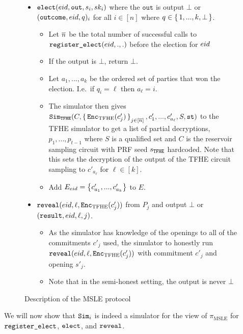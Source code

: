 \begin{figure}
{\begin{minipage}{1\textwidth}
\begin{itemize}

				\item $\texttt{elect}({eid}, \texttt{out}, s_i, sk_i)$ where the $\texttt{out}$ is output $\bot$ or $(\texttt{outcome}, {eid}, q)_i$ for all $i \in [n]$ where $q \in \set{1, ..., k, \bot}$.
				      \begin{itemize}
								\item Let $\overline{n}$ be the total number of successful calls to $\texttt{register\_elect}({eid}, ., .)$ before the election for ${eid}$
					      \item If the output is $\bot$, return $\bot$.
					      \item Let $a_1, ..., a_k$ be the ordered set of parties that won the election. I.e.\ if $q_i = \ell$ then $a_\ell = i$.
								\item The simulator then gives $\texttt{Sim}_{{\texttt{TFHE}}}(C, \set{\texttt{Enc}_{\mathrm{TFHE}}(c'_j)}_{j \in [\overline{n}]}, c'_1, ..., c'_{a_\ell}, S, \texttt{st})$
	to the TFHE simulator to get a list of partial decryptions, $p_1, ..., p_{t - 1}$ where $S$ is a qualified set %
	and $C$ is the reservoir sampling circuit with PRF seed $s_{\texttt{TFHE}}$ hardcoded.
	Note that this sets the decryption of the output of the TFHE circuit sampling to $c'_{a_\ell}$ for $\ell \in [k]$.
					      \item Add $E_{eid} = \left\{c'_{a_1}, ..., c'_{a_k}\right\}$ to $E$.
				      \end{itemize}
				\item $\texttt{reveal}({eid}, \ell, \texttt{Enc}_{\mathrm{TFHE}}(c'_j))$ from $P_j$ and output $\bot$ or $(\texttt{result}, {eid}, \ell, j)$.
				      \begin{itemize}
					      \item As the simulator has knowledge of the openings to all of the commitments $c'_j$ used, the simulator
								to honestly run $\texttt{reveal}({eid}, \ell, \texttt{Enc}_{\mathrm{TFHE}}(c'_j))$ with commitment $c'_j$ and opening $s'_j$.
								\item Note that in the semi-honest setting, the output is never $\bot$
				      \end{itemize}
			\end{itemize}
		\end{minipage}
	}
	\caption{Description of the MSLE protocol}
	\label{fig:protocolMSLE}
\end{figure}

We will now show that $\texttt{Sim}_i$ is indeed a simulator for the view of $\pi_{\text{MSLE}}$
for $\texttt{register\_elect}$, $\texttt{elect}$, and $\texttt{reveal}$.

